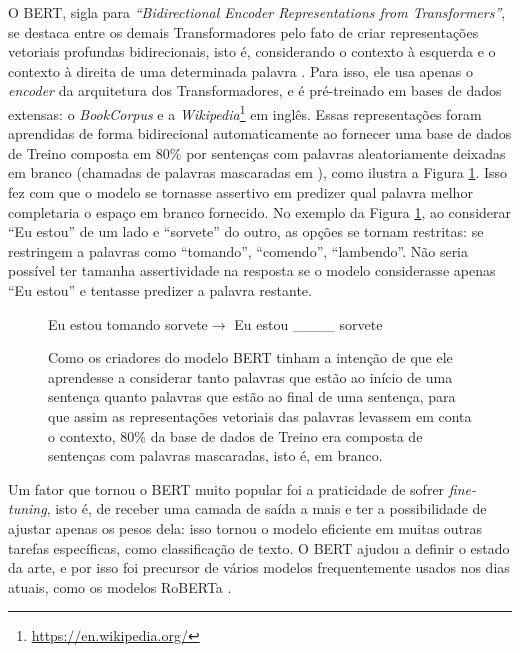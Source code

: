 O BERT, sigla para \textit{``Bidirectional Encoder Representations from Transformers''}, se destaca entre os demais Transformadores pelo fato de criar representações vetoriais profundas bidirecionais, isto é, considerando o contexto à esquerda e o contexto à direita de uma determinada palavra \cite{bert}. Para isso, ele usa apenas o \textit{encoder} da arquitetura dos Transformadores, e é pré-treinado em bases de dados extensas: o \textit{BookCorpus} \cite{bookcorpus_paper} e a \textit{Wikipedia}\footnote{\url{https://en.wikipedia.org/}} em inglês. Essas representações foram aprendidas de forma bidirecional automaticamente ao fornecer uma base de dados de Treino composta em 80\% por sentenças com palavras aleatoriamente deixadas em branco (chamadas de palavras mascaradas em ), como ilustra a Figura \ref{fig:ex_mlm}. Isso fez com que o modelo se tornasse assertivo em predizer qual palavra melhor completaria o espaço em branco fornecido. No exemplo da Figura \ref{fig:ex_mlm}, ao considerar ``Eu estou'' de um lado e ``sorvete'' do outro, as opções se tornam restritas: se restringem a palavras como ``tomando'', ``comendo'', ``lambendo''. Não seria possível ter tamanha assertividade na resposta se o modelo considerasse apenas ``Eu estou'' e tentasse predizer a palavra restante.

\begin{figure}[htb]
    \centering
    \color{blue}Eu estou tomando sorvete$\rightarrow$ Eu estou \_\_\_\_ sorvete
    \caption{Como os criadores do modelo BERT tinham a intenção de que ele aprendesse a considerar tanto palavras que estão ao início de uma sentença quanto palavras que estão ao final de uma sentença, para que assim as representações vetoriais das palavras levassem em conta o contexto, 80\% da base de dados de Treino era composta de sentenças com palavras mascaradas, isto é, em branco.}
    \label{fig:ex_mlm}
\end{figure}

Um fator que tornou o BERT muito popular foi a praticidade de sofrer \textit{fine-tuning}, isto é, de receber uma camada de saída a mais e ter a possibilidade de ajustar apenas os pesos dela: isso tornou o modelo eficiente em muitas outras tarefas específicas, como classificação de texto. O BERT ajudou a definir o estado da arte, e por isso foi precursor de vários modelos frequentemente usados nos dias atuais, como os modelos RoBERTa \cite{roberta_paper} \cite{transformers_book}.

